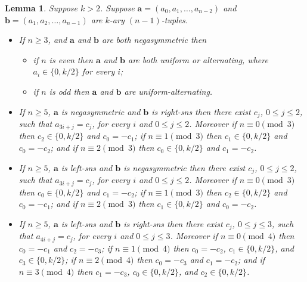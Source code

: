 \documentclass[10pt,a4paper]{amsart}
\newtheorem{lemma}{Lemma}
\begin{document}
\begin{lemma}  \label{lemma:NOS-constraint-interactions}
Suppose $k>2$.  Suppose $\mathbf{a}=(a_0,a_1,\dots,a_{n-2})$ and
$\mathbf{b}=(a_1,a_2,\dots,a_{n-1})$ are $k$-ary $(n-1)$-tuples.
\begin{itemize}
\item[i)] If $n\geq3$, and $\mathbf{a}$ and $\mathbf{b}$ are both negasymmetric then
    \begin{itemize}
    \item if $n$ is even then $\mathbf{a}$ and $\mathbf{b}$ are both uniform or
        alternating, where $a_i\in\{0,k/2\}$ for every $i$;
    \item if $n$ is odd then $\mathbf{a}$ and $\mathbf{b}$ are uniform-alternating.
    \end{itemize}

\item[ii)] If $n\geq5$, $\mathbf{a}$ is negasymmetric and $\mathbf{b}$ is right-sns then there
    exist $c_j$, $0\leq j\leq2$, such that $a_{3i+j}=c_j$, for every $i$ and $0\leq j\leq 2$.
    Moreover if $n\equiv0\pmod3$ then $c_2\in\{0,k/2\}$ and $c_0=-c_1$; if $n\equiv1\pmod3$
    then $c_1\in\{0,k/2\}$ and $c_0=-c_2$; and if $n\equiv2\pmod3$ then $c_0\in\{0,k/2\}$ and
    $c_1=-c_2$.

\item[iii)] If $n\geq5$, $\mathbf{a}$ is left-sns and $\mathbf{b}$ is negasymmetric then there
    exist $c_j$, $0\leq j\leq2$, such that $a_{3i+j}=c_j$, for every $i$ and $0\leq j\leq 2$.
    Moreover if $n\equiv0\pmod3$ then $c_0\in\{0,k/2\}$ and $c_1=-c_2$; if $n\equiv1\pmod3$
    then $c_2\in\{0,k/2\}$ and $c_0=-c_1$; and if $n\equiv2\pmod3$ then $c_1\in\{0,k/2\}$ and
    $c_0=-c_2$.

\item[iv)] If $n\geq5$, $\mathbf{a}$ is left-sns and $\mathbf{b}$ is right-sns then there exist
    $c_j$, $0\leq j\leq3$, such that $a_{4i+j}=c_j$, for every $i$ and $0\leq j\leq 3$.
    Moreover if $n\equiv0\pmod4$ then $c_0=-c_1$ and $c_2=-c_3$; if $n\equiv1\pmod4$ then
    $c_0=-c_2$, $c_1\in\{0,k/2\}$, and $c_3\in\{0,k/2\}$; if $n\equiv2\pmod4$ then $c_0=-c_3$
    and $c_1=-c_2$; and if $n\equiv3\pmod4$ then $c_1=-c_3$, $c_0\in\{0,k/2\}$, and
    $c_2\in\{0,k/2\}$.
\end{itemize}
\end{lemma}
\end{document}
